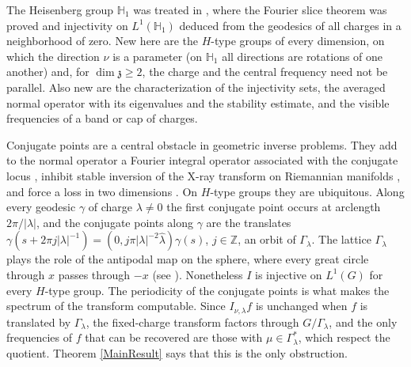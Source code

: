 \documentclass[11pt]{amsart}
\theoremstyle{plain}
\theoremstyle{definition}
\theoremstyle{remark}
\numberwithin{equation}{section}
\def\fz{\mathfrak{z}}
\def\Z{{\mathbb Z}}%
\def \heis {\mathbb{H}}
\numberwithin{equation}{section}
\begin{document}
The Heisenberg group $\heis_1$ was treated in \cite{flynnInjectivityHeisenbergXray2021}, where the Fourier slice theorem was proved and injectivity on $L^1(\heis_1)$ deduced from the geodesics of all charges in a neighborhood of zero. New here are the $H$-type groups of every dimension, on which the direction $\nu$ is a parameter (on $\heis_1$ all directions are rotations of one another) and, for $\dim\fz\geq2$, the charge and the central frequency need not be parallel. Also new are the characterization of the injectivity sets, the averaged normal operator with its eigenvalues and the stability estimate, and the visible frequencies of a band or cap of charges.

Conjugate points are a central obstacle in geometric inverse problems. They add to the normal operator a Fourier integral operator associated with the conjugate locus \cite{stefanovGeodesicXrayTransform2012}, inhibit stable inversion of the X-ray transform on Riemannian manifolds \cite{holmanAttenuatedGeodesicXray2018}, and force a loss in two dimensions \cite{monardGeodesicRayTransform2015}. On $H$-type groups they are ubiquitous. Along every geodesic $\gamma$ of charge $\lambda\neq 0$ the first conjugate point occurs at arclength $2\pi/|\lambda|$, and the conjugate points along $\gamma$ are the translates $\gamma(s+2\pi j|\lambda|^{-1})=(0, j\pi|\lambda|^{-2}\hat\lambda)\gamma(s)$, $j\in \Z$, an orbit of $\Gamma_\lambda$. The lattice $\Gamma_\lambda$ plays the role of the antipodal map on the sphere, where every great circle through $x$ passes through $-x$ (see \cite[Section 10.2]{stefanovGeodesicXrayTransform2012}). Nonetheless $I$ is injective on $L^1(G)$ for every $H$-type group. The periodicity of the conjugate points is what makes the spectrum of the transform computable. Since $I_{\nu, \lambda}f$ is unchanged when $f$ is translated by $\Gamma_\lambda$, the fixed-charge transform factors through $G/\Gamma_\lambda$, and the only frequencies of $f$ that can be recovered are those with $\mu\in \Gamma_\lambda^*$, which respect the quotient. Theorem \ref{MainResult} says that this is the only obstruction.
\end{document}
